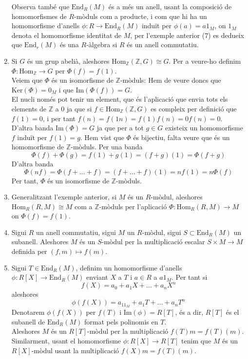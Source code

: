 \begin{enumerate}[(1)]
Observa també que $\text{End}_R(M)$ és a més un anell, usant la composició de homomorfismes de $R$-mòduls com a producte, i com que hi ha un homomorfisme d'anells $\phi: R\rightarrow \text{End}_R(M)$ induït per $\phi (a)=a1_M$, on $1_M$ denota el homomorfisme identitat de $M$, per l'exemple anterior (7) es dedueix que $\text{End}_r(M)$ és una $R$-àlgebra si $R$ és un anell commutatiu.
\item Si $G$ és un grup abelià, aleshores $\text{Hom}_{\mathbb{Z}}(\mathbb{Z},G)\cong G$. 
Per a veure-ho definim $\Phi: \text{Hom}_{\mathbb{Z}}  \rightarrow G $ per $\Phi (f)=f(1)$.\\
 Veiem que  $\Phi$ és un isomorfisme de $\mathbb{Z}$-mòduls: Hem de veure doncs que $\text{Ker}(\Phi)=0_M$ i que $\text{Im}(\Phi(f))=G$. 
\\ 
  El nucli només pot tenir un element, que és l'aplicació que envia tots els elements de $\mathbb{Z}$ a $0$ ja que si $f\in \text{Hom}_{\mathbb{Z}}(\mathbb{Z},G)$ es compleix per definició que $f(1)=0$, i per tant $f(n)=f(1n)=f(1)f(n)=0f(n)=0$. D'altra banda $\text{Im}(\Phi)=G$ ja que per a tot $g\in G$ existeix un homomorfisme $f$ induït per $f(1)=g$. Hem vist que $\Phi$ és bijectiu, falta veure que és un homomorfisme de $\mathbb{Z}$-mòduls. Per una banda $$\Phi(f)+\Phi(g)=f(1)+g(1)=(f+g)(1)=\Phi( f+g )$$
  D'altra banda 
  $$
  \Phi(nf)=\Phi(f+\dots +f)=(f+\dots +f)(1)=nf(1)=n\Phi (f)
  $$
  Per tant, $\Phi$ és un isomorfisme de $\mathbb{Z}$-mòduls.
  \item Generalitzant l'exemple anterior, si $M$ és un $R$-mòdul, aleshores $\text{Hom}_R(R,M)\cong M$ com a $\mathbb{Z}$-mòduls per l'aplicació $\Phi : \text{Hom}_R (R,M)\rightarrow M$ on $\Phi(f)=f(1)$.
  \item Sigui $R$ un anell commutatiu, sigui $M$ un $R$-mòdul, sigui $S\subset \text{End}_R (M)$ un subanell. Aleshores $M$ és un $S$-mòdul per la multiplicació escalar $S\times M \rightarrow M$ definida per $(f,m)\mapsto f(m)$.
  \item Sigui $T\in \text{End}_R(M)$, definim un homomorfisme d'anells $\phi : R[X] \rightarrow \text{End}_R(M)$ enviant $X$ a $T$ i $a\in R$ a $a1_M$. Per tant si 
  $$
  f(X)=a_0+a_1X+\dots + a_nX^n
  $$
  aleshores 
  $$
  \phi(f(X))=a_11_M+a_1T+\dots + a_nT^n
  $$
  Denotarem $\phi(f(X))$ per $f(T)$ i $\text{Im}(\phi)=R[T]$, és a dir, $R[T]$ és el subanell de $\text{End}_R(M)$ format pels polinomis en $T$. \\  
  Aleshores $M$ és un $R[T]$-mòdul per la multiplicació $f(T)m=f(T)(m)$. Similarment, usant el homomorfisme $\phi : R[X]\rightarrow R[T]$ tenim que $M$ és un $R[X]$-mòdul usant la multiplicació $f(X)m=f(T)(m)$.

\end{enumerate}

